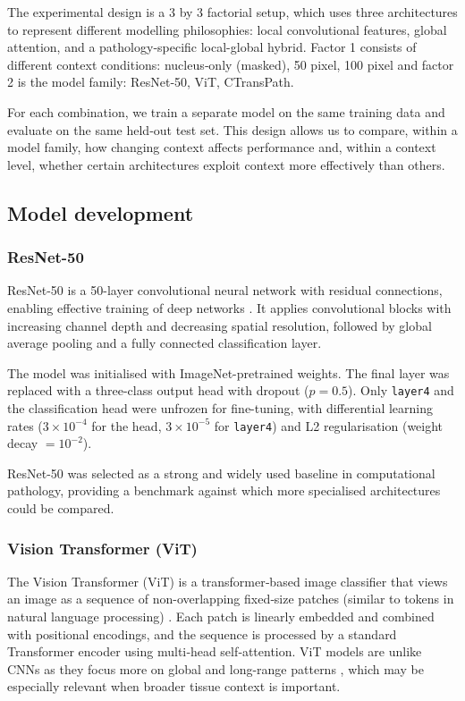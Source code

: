 \documentclass[11pt,a4paper]{article}
\begin{document}
    The experimental design is a 3 by 3 factorial setup, which uses three architectures to represent different modelling philosophies: local convolutional features, global attention, and a pathology‑specific local-global hybrid. Factor 1 consists of different context conditions: nucleus‑only (masked), 50 pixel, 100 pixel and factor 2 is the model family: ResNet‑50, ViT, CTransPath.

    For each combination, we train a separate model on the same training data and evaluate on the same held‑out test set. This design allows us to compare, within a model family, how changing context affects performance and, within a context level, whether certain architectures exploit context more effectively than others.

\subsection{Model development}

\subsubsection{ResNet-50}

ResNet-50 is a 50-layer convolutional neural network with residual connections, enabling 
effective training of deep networks \citep{he2016deep}. It applies convolutional blocks 
with increasing channel depth and decreasing spatial resolution, followed by global 
average pooling and a fully connected classification layer.

The model was initialised with ImageNet-pretrained weights. The final layer was replaced 
with a three-class output head with dropout ($p = 0.5$). Only \texttt{layer4} and the 
classification head were unfrozen for fine-tuning, with differential learning rates 
($3 \times 10^{-4}$ for the head, $3 \times 10^{-5}$ for \texttt{layer4}) and L2 
regularisation (weight decay $= 10^{-2}$).

ResNet-50 was selected as a strong and widely used baseline in computational pathology, 
providing a benchmark against which more specialised architectures could be compared.

\subsubsection{Vision Transformer (ViT)}
    The Vision Transformer (ViT) is a transformer‑based image classifier that views an image as a sequence of non-overlapping fixed‑size patches (similar to tokens in natural language processing) \citep{dosovitskiy2021, wu2020}. Each patch is linearly embedded and combined with positional encodings, and the sequence is processed by a standard Transformer encoder using multi‑head self‑attention. ViT models are unlike CNNs as they focus more on global and long-range patterns \citep{wu2020}, which may be especially relevant when broader tissue context is important. 
    
\end{document}
